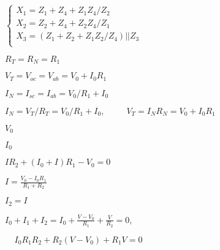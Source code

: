 \documentclass{article}
\def\lthtmlcheckvsize{\ifdim\ht\sizebox<\vsize 
  \ifdim\wd\sizebox<\hsize\expandafter\hfill\fi \expandafter\vfill
  \else\expandafter\vss\fi}%
\begin{document}
{\newpage\clearpage
{}%
$\displaystyle \left\{ \begin{array}{l}
X_1=Z_1+Z_4+Z_1Z_4/Z_2 \\
X_2=Z_2+Z_4+Z_2Z_4/Z_1 \\
X_3=(Z_1+Z_2+Z_1Z_2/Z_4) || Z_3 \\
\end{array} \right.$%
\lthtmlindisplaymathZ
\lthtmlcheckvsize\clearpage}

{\newpage\clearpage
{}%
$ R_T=R_N=R_1$%
\lthtmlindisplaymathZ
\lthtmlcheckvsize\clearpage}

{\newpage\clearpage
{}%
$ V_T=V_{oc}=V_{ab}=V_0+I_0R_1$%
\lthtmlindisplaymathZ
\lthtmlcheckvsize\clearpage}

{\newpage\clearpage
{}%
$ I_N=I_{sc}=I_{ab}=V_0/R_1+I_0$%
\lthtmlindisplaymathZ
\lthtmlcheckvsize\clearpage}

{\newpage\clearpage
{}%
$\displaystyle I_N=V_T/R_T=V_0/R_1+I_0,\;\;\;\;\;\;\;\;\;
V_T=I_N R_N=V_0+I_0R_1$%
\lthtmlindisplaymathZ
\lthtmlcheckvsize\clearpage}

{\newpage\clearpage
{}%
$ V_0$%
\lthtmlindisplaymathZ
\lthtmlcheckvsize\clearpage}

{\newpage\clearpage
{}%
$ I_0$%
\lthtmlindisplaymathZ
\lthtmlcheckvsize\clearpage}

{\newpage\clearpage
{}%
$\displaystyle I R_2+(I_0+I) R_1-V_0=0$%
\lthtmlindisplaymathZ
\lthtmlcheckvsize\clearpage}

{\newpage\clearpage
{}%
$\displaystyle I=\frac{V_0-I_0 R_1}{R_1+R_2}$%
\lthtmlindisplaymathZ
\lthtmlcheckvsize\clearpage}

{\newpage\clearpage
{}%
$ I_2=I$%
\lthtmlindisplaymathZ
\lthtmlcheckvsize\clearpage}

{\newpage\clearpage
{}%
$\displaystyle I_0+I_1+I_2=I_0+\frac{V-V_0}{R_1}+\frac{V}{R_2}=0,\;\;\;\;$%
\lthtmlindisplaymathZ
\lthtmlcheckvsize\clearpage}

{\newpage\clearpage
{}%
$\displaystyle \;\;\;\;
I_0R_1R_2+R_2(V-V_0)+R_1V=0$%
\lthtmlindisplaymathZ
\lthtmlcheckvsize\clearpage}
\end{document}
